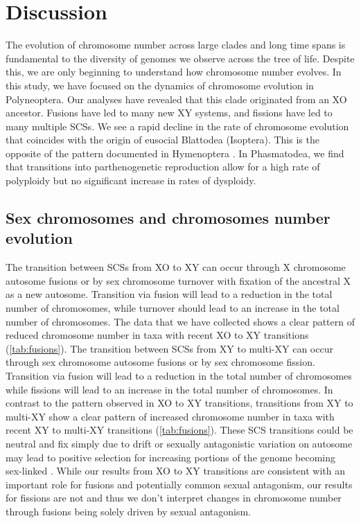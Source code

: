\section{Discussion}

The evolution of chromosome number across large clades and long time spans is fundamental to the diversity of genomes we observe across the tree of life.
Despite this, we are only beginning to understand how chromosome number evolves.
In this study, we have focused on the dynamics of chromosome evolution in Polyneoptera. 
Our analyses have revealed that this clade originated from an XO ancestor. 
Fusions have led to many new XY systems, and fissions have led to many multiple SCSs.
We see a rapid decline in the rate of chromosome evolution that coincides with the origin of eusocial Blattodea (Isoptera).
This is the opposite of the pattern documented in Hymenoptera \citep{ross2015}.
In Phasmatodea, we find that transitions into parthenogenetic reproduction allow for a high rate of polyploidy but no significant increase in rates of dysploidy.

\subsection{Sex chromosomes and chromosomes number evolution}
The transition between SCSs from XO to XY can occur through X chromosome autosome fusions or by sex chromosome turnover with fixation of the ancestral X as a new autosome.
Transition via fusion will lead to a reduction in the total number of chromosomes, while turnover should lead to an increase in the total number of chromosomes.
The data that we have collected shows a clear pattern of reduced chromosome number in taxa with recent XO to XY transitions (\cref{tab:fusions}).
The transition between SCSs from XY to multi-XY can occur through sex chromosome autosome fusions or by sex chromosome fission.
Transition via fusion will lead to a reduction in the total number of chromosomes while fissions will lead to an increase in the total number of chromosomes.
In contrast to the pattern observed in XO to XY transitions, transitions from XY to multi-XY show a clear pattern of increased chromosome number in taxa with recent XY to multi-XY transitions (\cref{tab:fusions}).
These SCS transitions could be neutral and fix simply due to drift or sexually antagonistic variation on autosome may lead to positive selection for increasing portions of the genome becoming sex-linked \citep{charlesworth1980, kitano2012}.
While our results from XO to XY transitions are consistent with an important role for fusions and potentially common sexual antagonism, our results for fissions are not and thus we don't interpret changes in chromosome number through fusions being solely driven by sexual antagonism. 

